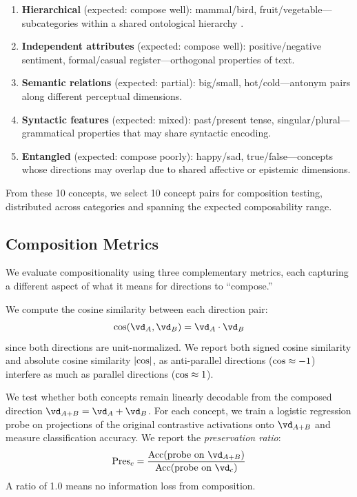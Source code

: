 \begin{enumerate}[leftmargin=*,itemsep=2pt,topsep=2pt]
    \item \textbf{Hierarchical} (expected: compose well): mammal/bird,
    fruit/vegetable---subcategories within a shared ontological hierarchy
    \citep{park2024geometry}.
    \item \textbf{Independent attributes} (expected: compose well):
    positive/negative sentiment, formal/casual register---orthogonal
    properties of text.
    \item \textbf{Semantic relations} (expected: partial): big/small,
    hot/cold---antonym pairs along different perceptual dimensions.
    \item \textbf{Syntactic features} (expected: mixed): past/present tense,
    singular/plural---grammatical properties that may share syntactic
    encoding.
    \item \textbf{Entangled} (expected: compose poorly): happy/sad,
    true/false---concepts whose directions may overlap due to shared
    affective or epistemic dimensions.
\end{enumerate}

From these 10 concepts, we select 10 concept pairs for composition testing,
distributed across categories and spanning the expected composability range.

\subsection{Composition Metrics}

We evaluate compositionality using three complementary metrics, each capturing
a different aspect of what it means for directions to ``compose.''

We compute the cosine similarity between each direction pair:
\begin{equation}
    \cossim(\dA, \dB) = \dA \cdot \dB
    \label{eq:cosine}
\end{equation}
since both directions are unit-normalized. We report both signed cosine
similarity and absolute cosine similarity $|\text{cos}|$, as anti-parallel
directions ($\text{cos} \approx -1$) interfere as much as parallel directions
($\text{cos} \approx 1$).

We test whether both concepts remain linearly decodable from the composed
direction $\dAB = \dA + \dB$. For each concept, we train a logistic regression
probe on projections of the original contrastive activations onto $\dAB$ and
measure classification accuracy. We report the \emph{preservation ratio}:
\begin{equation}
    \preservation_c = \frac{\text{Acc}(\text{probe on } \dAB)}
                           {\text{Acc}(\text{probe on } \vd_c)}
    \label{eq:preservation}
\end{equation}
A ratio of 1.0 means no information loss from composition.

